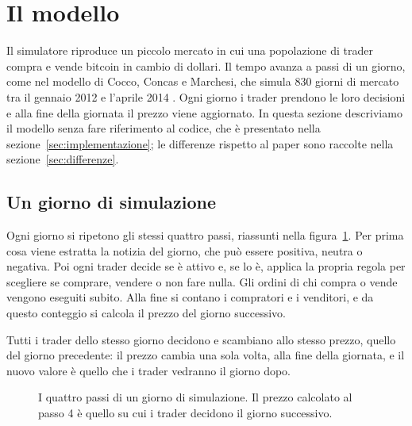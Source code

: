 \section{Il modello}
\label{sec:modello}

Il simulatore riproduce un piccolo mercato in cui una popolazione di trader compra e vende bitcoin in cambio di dollari. Il tempo avanza a passi di un giorno, come nel modello di Cocco, Concas e Marchesi, che simula 830 giorni di mercato tra il gennaio 2012 e l'aprile 2014 \cite{paper_riferimento}. Ogni giorno i trader prendono le loro decisioni e alla fine della giornata il prezzo viene aggiornato. In questa sezione descriviamo il modello senza fare riferimento al codice, che è presentato nella sezione~\ref{sec:implementazione}; le differenze rispetto al paper sono raccolte nella sezione~\ref{sec:differenze}.

\subsection{Un giorno di simulazione}

Ogni giorno si ripetono gli stessi quattro passi, riassunti nella figura~\ref{fig:giorno}. Per prima cosa viene estratta la notizia del giorno, che può essere positiva, neutra o negativa. Poi ogni trader decide se è attivo e, se lo è, applica la propria regola per scegliere se comprare, vendere o non fare nulla. Gli ordini di chi compra o vende vengono eseguiti subito. Alla fine si contano i compratori e i venditori, e da questo conteggio si calcola il prezzo del giorno successivo.

Tutti i trader dello stesso giorno decidono e scambiano allo stesso prezzo, quello del giorno precedente: il prezzo cambia una sola volta, alla fine della giornata, e il nuovo valore è quello che i trader vedranno il giorno dopo.

\begin{figure}[H]
\centering
{}
\caption{I quattro passi di un giorno di simulazione. Il prezzo calcolato al passo 4 è quello su cui i trader decidono il giorno successivo.}
\label{fig:giorno}
\end{figure}

